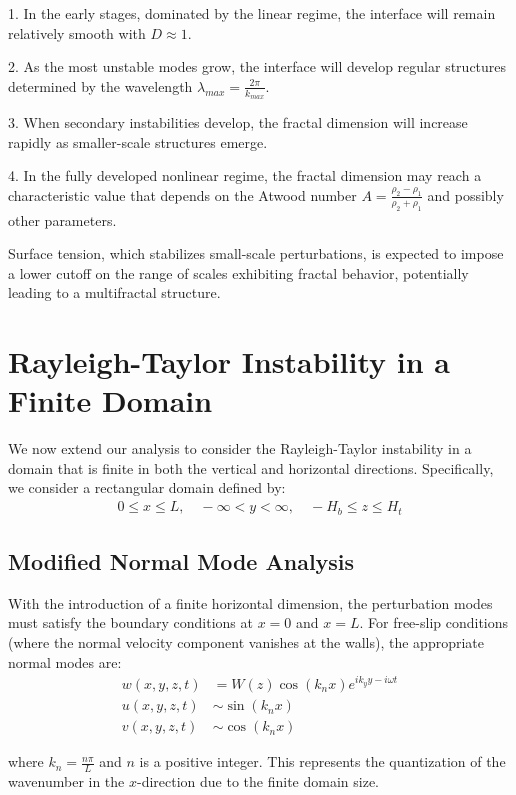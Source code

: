 \documentclass[12pt,a4paper]{article}
\begin{document}
1. In the early stages, dominated by the linear regime, the interface will remain relatively smooth with $D \approx 1$.

2. As the most unstable modes grow, the interface will develop regular structures determined by the wavelength $\lambda_{max} = \frac{2\pi}{k_{max}}$.

3. When secondary instabilities develop, the fractal dimension will increase rapidly as smaller-scale structures emerge.

4. In the fully developed nonlinear regime, the fractal dimension may reach a characteristic value that depends on the Atwood number $A = \frac{\rho_2 - \rho_1}{\rho_2 + \rho_1}$ and possibly other parameters.

Surface tension, which stabilizes small-scale perturbations, is expected to impose a lower cutoff on the range of scales exhibiting fractal behavior, potentially leading to a multifractal structure.

\section{Rayleigh-Taylor Instability in a Finite Domain}
We now extend our analysis to consider the Rayleigh-Taylor instability in a domain that is finite in both the vertical and horizontal directions. Specifically, we consider a rectangular domain defined by:
\begin{align}
0 \leq x \leq L, \quad -\infty < y < \infty, \quad -H_b \leq z \leq H_t
\end{align}

\subsection{Modified Normal Mode Analysis}
With the introduction of a finite horizontal dimension, the perturbation modes must satisfy the boundary conditions at $x = 0$ and $x = L$. For free-slip conditions (where the normal velocity component vanishes at the walls), the appropriate normal modes are:
\begin{align}
w(x,y,z,t) &= W(z)\cos(k_n x)e^{ik_y y - i\omega t} \\
u(x,y,z,t) &\sim \sin(k_n x) \\
v(x,y,z,t) &\sim \cos(k_n x)
\end{align}

where $k_n = \frac{n\pi}{L}$ and $n$ is a positive integer. This represents the quantization of the wavenumber in the $x$-direction due to the finite domain size.
\end{document}
